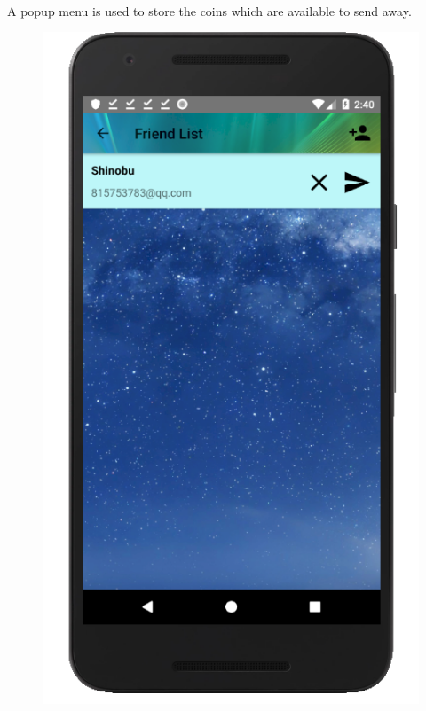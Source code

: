 \documentclass[12pt]{article}
\begin{document}
\paragraph{}
A popup menu is used to store the coins which are available to send away.
\begin{figure}
	\centering
	\includegraphics[scale=0.25]{Friend.png}

\end{figure}
\end{document}
